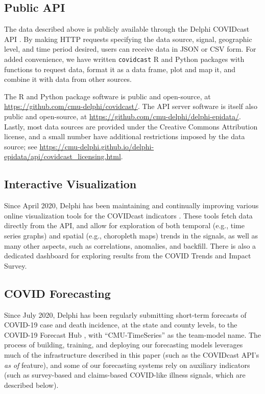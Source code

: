\documentclass[9pt,twocolumn,twoside,lineno]{pnas-new}
\begin{document}
\subsection{Public API}

The data described above is publicly available through the Delphi COVIDcast API
\cite{CovidcastAPI}.  By making HTTP requests specifying the data source,
signal, geographic level, and time period desired, users can receive data in
JSON or CSV form. For added convenience, we have written \texttt{covidcast} R
\cite{CovidcastR} and Python \cite{CovidcastPy} packages with functions to
request data, format it as a data frame, plot and map it, and combine it with
data from other sources.

The R and Python package software is public and open-source, at
\url{https://github.com/cmu-delphi/covidcast/}.  The API server software is
itself also public and open-source, at
\url{https://github.com/cmu-delphi/delphi-epidata/}.  Lastly, most data sources 
are provided under the Creative Commons Attribution license, and a small number
have additional restrictions imposed by the data source; see
\url{https://cmu-delphi.github.io/delphi-epidata/api/covidcast_licensing.html}.

\subsection{Interactive Visualization}

Since April 2020, Delphi has been maintaining and continually improving various
online visualization tools for the COVIDcast indicators \cite{CovidcastViz}.
These tools fetch data directly from the API, and allow for exploration of both
temporal (e.g., time series graphs) and spatial (e.g., choropleth maps) trends
in the signals, as well as many other aspects, such as correlations, anomalies,
and backfill. There is also a dedicated dashboard for exploring results from the
COVID Trends and Impact Survey.

\subsection{COVID Forecasting} 

Since July 2020, Delphi has been regularly submitting short-term forecasts of
COVID-19 case and death incidence, at the state and county levels, to the
COVID-19 Forecast Hub \cite{ForecastHub}, with ``CMU-TimeSeries'' as the
team-model name.  The process of building, training, and deploying our
forecasting models leverages much of the infrastructure described in this paper
(such as the COVIDcast API's \textit{as of} feature), and some of our
forecasting systems rely on auxiliary indicators (such as survey-based and
claims-based COVID-like illness signals, which are described below).
\end{document}
